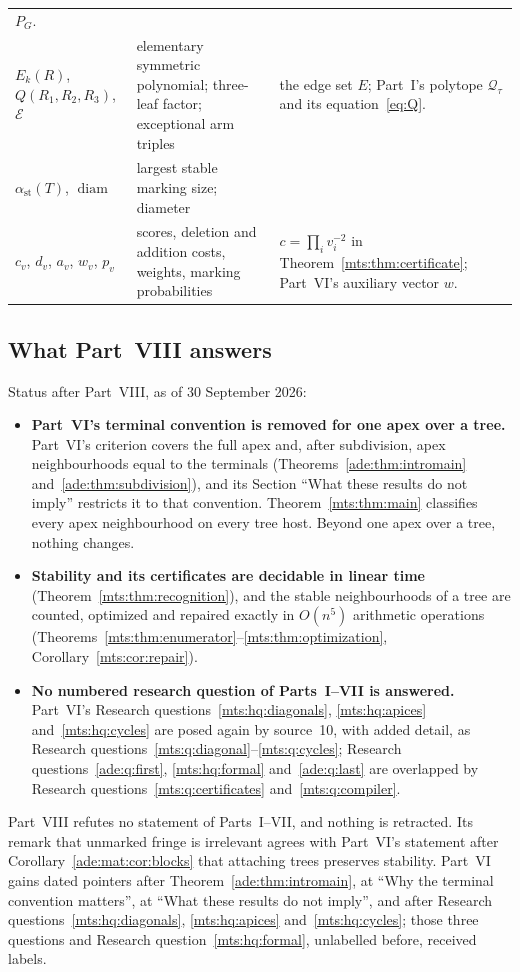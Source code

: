 \documentclass[11pt]{article}
\numberwithin{equation}{section}
\theoremstyle{definition}
\newcommand{\Qt}{\mathcal Q_\tau}
\newcommand{\diam}{\operatorname{diam}}
\begin{document}
\begin{table}[tbp]
\begin{tabularx}{\textwidth}{@{}>{\raggedright}p{}>{\raggedright}p{}Y@{}}
 $P_G$.\\
$E_k(R)$, $Q(R_1,R_2,R_3)$, $\mathcal E$ & elementary symmetric polynomial;
 three-leaf factor; exceptional arm triples & the edge set $E$; Part~I's
 polytope $\Qt$ and its equation~\eqref{eq:Q}.\\
$\alpha_{\mathrm{st}}(T)$, $\diam$ & largest stable marking size; diameter
 & \\
$c_v$, $d_v$, $a_v$, $w_v$, $p_v$ & scores, deletion and addition costs,
 weights, marking probabilities & $c=\prod_iv_i^{-2}$ in
 Theorem~\ref{mts:thm:certificate}; Part~VI's auxiliary vector $w$.\\
\bottomrule
\end{tabularx}
\end{table}

\subsection{What Part~VIII answers}
\label{mts:sec:answers}
Status after Part~VIII, as of 30 September 2026:
\begin{itemize}[leftmargin=1.4em]
\item \textbf{Part~VI's terminal convention is removed for one apex over a
tree.} Part~VI's criterion covers the full apex and, after subdivision,
apex neighbourhoods equal to the terminals
(Theorems~\ref{ade:thm:intromain} and~\ref{ade:thm:subdivision}), and its
Section ``What these results do not imply'' restricts it to that
convention. Theorem~\ref{mts:thm:main} classifies every apex neighbourhood
on every tree host. Beyond one apex over a tree, nothing changes.
\item \textbf{Stability and its certificates are decidable in linear time}
(Theorem~\ref{mts:thm:recognition}), and the stable neighbourhoods of a
tree are counted, optimized and repaired exactly in $O(n^5)$ arithmetic
operations (Theorems~\ref{mts:thm:enumerator}--\ref{mts:thm:optimization},
Corollary~\ref{mts:cor:repair}).
\item \textbf{No numbered research question of Parts~I--VII is answered.}
Part~VI's Research questions~\ref{mts:hq:diagonals}, \ref{mts:hq:apices}
and~\ref{mts:hq:cycles} are posed again by source~10, with added detail, as
Research questions~\ref{mts:q:diagonal}--\ref{mts:q:cycles}; Research
questions~\ref{ade:q:first}, \ref{mts:hq:formal} and~\ref{ade:q:last} are
overlapped by Research questions~\ref{mts:q:certificates}
and~\ref{mts:q:compiler}.
\end{itemize}
Part~VIII refutes no statement of Parts~I--VII, and nothing is retracted.
Its remark that unmarked fringe is irrelevant agrees with Part~VI's
statement after Corollary~\ref{ade:mat:cor:blocks} that attaching trees
preserves stability. Part~VI gains dated pointers after
Theorem~\ref{ade:thm:intromain}, at ``Why the terminal convention
matters'', at ``What these results do not imply'', and after Research
questions~\ref{mts:hq:diagonals}, \ref{mts:hq:apices}
and~\ref{mts:hq:cycles}; those three questions and Research
question~\ref{mts:hq:formal}, unlabelled before, received labels.
\end{document}

